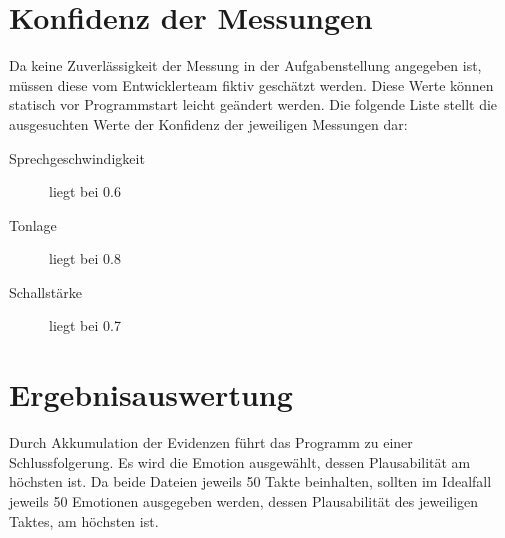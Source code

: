 \section{Konfidenz der Messungen}
\label{konfidenzfestlegung}
Da keine Zuverlässigkeit der Messung in der Aufgabenstellung angegeben ist, müssen diese vom Entwicklerteam fiktiv geschätzt werden. Diese Werte können statisch vor Programmstart leicht geändert werden. Die folgende Liste stellt die ausgesuchten Werte der Konfidenz der jeweiligen Messungen dar:
\begin{description}
\item [Sprechgeschwindigkeit] liegt bei 0.6
\item [Tonlage] liegt bei 0.8
\item [Schallstärke] liegt bei 0.7
\end{description}


\section{Ergebnisauswertung}
Durch Akkumulation der Evidenzen führt das Programm zu einer Schlussfolgerung. Es wird die Emotion ausgewählt, dessen Plausabilität am höchsten ist. Da beide Dateien jeweils 50 Takte beinhalten, sollten im Idealfall jeweils 50 Emotionen ausgegeben werden, dessen Plausabilität des jeweiligen Taktes, am höchsten ist.



